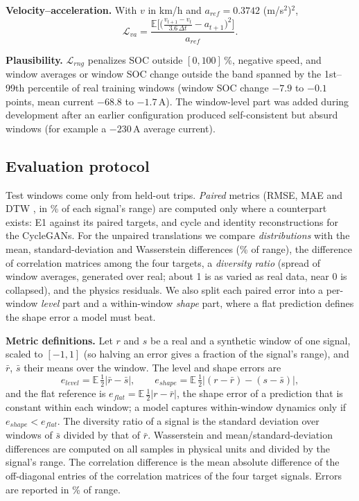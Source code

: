 \documentclass[conference]{IEEEtran}
\begin{document}
\textbf{Velocity--acceleration.} With $v$ in km/h and $a_{ref}=0.3742$ (m/s$^2$)$^2$,
\begin{equation}
\mathcal{L}_{va}=\frac{\mathbb{E}\big[\big(\tfrac{v_{t+1}-v_t}{3.6\,\Delta t}-a_{t+1}\big)^2\big]}{a_{ref}}.
\end{equation}

\textbf{Plausibility.} $\mathcal{L}_{rng}$ penalizes SOC outside $[0,100]$\,\%, negative speed, and window averages or window SOC change outside the band spanned by the 1st--99th percentile of real training windows (window SOC change $-7.9$ to $-0.1$ points, mean current $-68.8$ to $-1.7$\,A). The window-level part was added during development after an earlier configuration produced self-consistent but absurd windows (for example a $-230$\,A average current).

\subsection{Evaluation protocol}
Test windows come only from held-out trips. \emph{Paired} metrics (RMSE, MAE and DTW \cite{senin2008dtw}, in \% of each signal's range) are computed only where a counterpart exists: E1 against its paired targets, and cycle and identity reconstructions for the CycleGANs. For the unpaired translations we compare \emph{distributions} with the mean, standard-deviation and Wasserstein differences (\% of range), the difference of correlation matrices among the four targets, a \emph{diversity ratio} (spread of window averages, generated over real; about 1 is as varied as real data, near 0 is collapsed), and the physics residuals. We also split each paired error into a per-window \emph{level} part and a within-window \emph{shape} part, where a flat prediction defines the shape error a model must beat.

\textbf{Metric definitions.} Let $r$ and $s$ be a real and a synthetic window of one signal, scaled to $[-1,1]$ (so halving an error gives a fraction of the signal's range), and $\bar r$, $\bar s$ their means over the window. The level and shape errors are
\begin{equation}
e_{level}=\mathbb{E}\,\tfrac{1}{2}\lvert\bar r-\bar s\rvert,\qquad
e_{shape}=\mathbb{E}\,\tfrac{1}{2}\lvert (r-\bar r)-(s-\bar s)\rvert,
\end{equation}
and the flat reference is $e_{flat}=\mathbb{E}\,\tfrac{1}{2}\lvert r-\bar r\rvert$, the shape error of a prediction that is constant within each window; a model captures within-window dynamics only if $e_{shape}<e_{flat}$. The diversity ratio of a signal is the standard deviation over windows of $\bar s$ divided by that of $\bar r$. Wasserstein and mean/standard-deviation differences are computed on all samples in physical units and divided by the signal's range. The correlation difference is the mean absolute difference of the off-diagonal entries of the correlation matrices of the four target signals. Errors are reported in \% of range.
\end{document}
